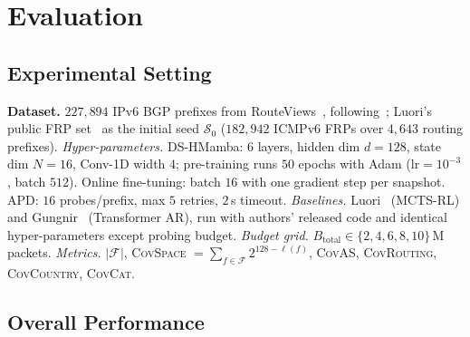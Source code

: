\documentclass[conference]{IEEEtran}
\begin{document}
\section{Evaluation}\label{sec:eval}

\subsection{Experimental Setting}\label{sec:eval:setup}
\textbf{Dataset.}  $227{,}894$ IPv6 BGP prefixes from
RouteViews~\cite{routeviews}, following~\cite{wei2025gungnir};
Luori's public FRP set~\cite{cheng2024luori} as the initial
seed $\mathcal{S}_0$ ($182{,}942$ ICMPv6 FRPs over $4{,}643$
routing prefixes).
\emph{Hyper-parameters.}  DS-HMamba: $6$ layers, hidden dim $d{=}128$,
state dim $N{=}16$, Conv-1D width $4$; pre-training runs $50$
epochs with Adam ($\text{lr}{=}10^{-3}$, batch $512$).  Online
fine-tuning: batch $16$ with one gradient step per snapshot.
APD: $16$ probes/prefix, max $5$ retries, $2$\,s timeout.
\emph{Baselines.}  Luori~\cite{cheng2024luori} (MCTS-RL) and
Gungnir~\cite{wei2025gungnir} (Transformer AR), run with
authors' released code and identical hyper-parameters except
probing budget.
\emph{Budget grid.} $B_{\text{total}}\!\in\!\{2,4,6,8,10\}$\,M
packets.
\emph{Metrics.} $|\mathcal{F}|$, \textsc{CovSpace}
$=\!\sum_{f\in\mathcal{F}}2^{128-\ell(f)}$, \textsc{CovAS},
\textsc{CovRouting}, \textsc{CovCountry}, \textsc{CovCat}.

\subsection{Overall Performance}\label{sec:eval:perf}
\end{document}
